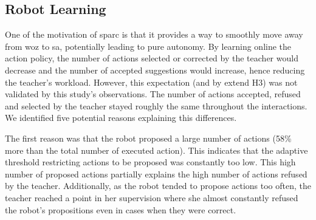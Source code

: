 

\subsection{Robot Learning}



One of the motivation of \gls{sparc} is that it provides a way to smoothly move away from \gls{woz} to \gls{sa}, potentially leading to pure autonomy. By learning online the action policy, the number of actions selected or corrected by the teacher would decrease and the number of accepted suggestions would increase, hence reducing the teacher's workload. However, this expectation (and by extend H3) was not validated by this study's observations. The number of actions accepted, refused and selected by the teacher stayed roughly the same throughout the interactions. We identified five potential reasons explaining this differences.

The first reason was that the robot proposed a large number of actions (58\% more than the total number of executed action). This indicates that the adaptive threshold restricting actions to be proposed was constantly too low. This high number of proposed actions partially explains the high number of actions refused by the teacher. Additionally, as the robot tended to propose actions too often, the teacher reached a point in her supervision where she almost constantly refused the robot's propositions even in cases when they were correct. 

